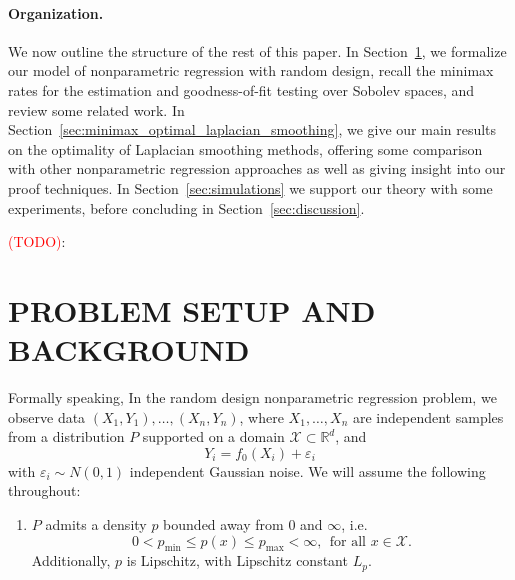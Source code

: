 \documentclass[twoside]{article}
\newcommand{\Reals}{\mathbb{R}}
\newcommand{\1}{\mathbf{1}}
\newcommand{\Xset}{\mathcal{X}}
\theoremstyle{definition}
\theoremstyle{remark}
\begin{document}
\paragraph{Organization.}
We now outline the structure of the rest of this paper. In Section~\ref{sec:problem_setup_and_background}, we formalize our model of nonparametric regression with random design, recall the minimax rates for the estimation and goodness-of-fit testing over Sobolev spaces, and review some related work. In Section~\ref{sec:minimax_optimal_laplacian_smoothing}, we give our main results on the optimality of Laplacian smoothing methods, offering some comparison with other nonparametric regression approaches as well as giving insight into our proof techniques. In Section~\ref{sec:simulations} we support our theory with some experiments, before concluding in Section~\ref{sec:discussion}.



\textcolor{red}{(TODO)}:

\section{PROBLEM SETUP AND BACKGROUND}
\label{sec:problem_setup_and_background}
Formally speaking, In the random design nonparametric regression problem, we observe data $(X_1,Y_1),\ldots,(X_n,Y_n)$, where $X_1,\ldots,X_n$ are independent samples from a distribution $P$ supported on a domain $\Xset \subset \Reals^d$, and 
\begin{equation}
\label{eqn:random_design_regression}
Y_i = f_0(X_i) + \varepsilon_i
\end{equation}
with $\varepsilon_i \sim N(0,1)$ independent Gaussian noise. We will assume the following throughout:
\begin{enumerate}[label=(P\arabic*)]
	\item
	\label{asmp:bounded_lipschitz_density} 
	$P$ admits a density $p$ bounded away from $0$ and $\infty$, i.e.
	\begin{equation*}
	0 < p_{\min} \leq p(x) \leq p_{\max} < \infty,~~\textrm{for all $x \in \Xset$.}
	\end{equation*}
	Additionally, $p$ is Lipschitz, with Lipschitz constant $L_p$.
\end{enumerate}
\end{document}
